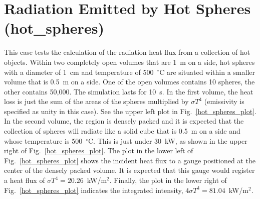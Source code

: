 \documentclass[11pt]{book}
\begin{document}
\clearpage

\section{Radiation Emitted by Hot Spheres (\texorpdfstring{{\bf hot\_spheres}}{hot\_spheres}) }
\label{hot_spheres}

This case tests the calculation of the radiation heat flux from a collection of hot objects. Within two
completely open volumes that are 1~m on a side, hot spheres with a diameter of 1~cm and temperature of 500~$^\circ$C are
situated within a smaller volume that is 0.5~m on a side. One of the open volumes contains 10 spheres, the other contains
50,000. The simulation lasts for
10~s. In the first volume, the heat loss is just the sum
of the areas of the spheres multiplied by $\sigma T^4$ (emissivity is specified as unity in this case). See
the upper left plot in Fig.~\ref{hot_spheres_plot}. In the second
volume, the region is densely packed and it is expected that the collection of spheres will radiate like a solid cube  that is
0.5~m on a side and whose temperature is 500~$^\circ$C. This is just under 30~kW, as
shown in the upper right of Fig.~\ref{hot_spheres_plot}. The plot in the lower left of Fig.~\ref{hot_spheres_plot}
shows the incident heat flux to a gauge positioned at the center of the densely packed volume.
It is expected that this gauge would register a heat flux of
$\sigma T^4=20.26$~kW/m$^2$. Finally, the plot in the lower right of Fig.~\ref{hot_spheres_plot} indicates the
integrated intensity, $4 \sigma T^4=81.04$~kW/m$^2$.
\end{document}
